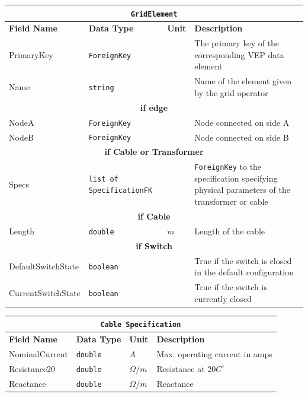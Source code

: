 \vspace{.5cm}

\begin{tabular}{ l p{3cm} l p{8cm}} 
    \hline
    \multicolumn{4}{c}{\texttt{GridElement}}\\
    \hline
    \textbf{Field Name} & \textbf{Data Type}            & \textbf{Unit} & \textbf{Description} \\
    \hline
    PrimaryKey          & \texttt{ForeignKey}           &               & The primary key of the corresponding VEP data element\\
    Name                & \texttt{string}               &               & Name of the element given by the grid operator\\
    \hline
    \multicolumn{4}{c}{\textbf{if edge}}\\
    \hline
    NodeA               & \texttt{ForeignKey}           &               & Node connected on side A\\
    NodeB               & \texttt{ForeignKey}           &               & Node connected on side B\\
    \hline
    \multicolumn{4}{c}{\textbf{if Cable or Transformer}}\\
    \hline
    Specs               & \texttt{list of SpecificationFK}             &               & \texttt{ForeignKey} to the specification specifying physical parameters of the transformer or cable\\
    \hline
    \multicolumn{4}{c}{\textbf{if Cable}}\\
    \hline
    Length              & \texttt{double}              &  $m$          & Length of the cable\\
    \hline
    \multicolumn{4}{c}{\textbf{if Switch}}\\
    \hline
    DefaultSwitchState  & \texttt{boolean}             &               & True if the switch is closed in the default configuration\\
    CurrentSwitchState  & \texttt{boolean}             &               & True if the switch is currently closed\\
\end{tabular}

\vspace{.5cm}

\begin{tabular}{ l p{3cm} l p{8cm}} 
    \hline
    \multicolumn{4}{c}{\texttt{Cable Specification}}\\
    \hline
    \textbf{Field Name} & \textbf{Data Type}        & \textbf{Unit} & \textbf{Description} \\
    \hline
    NominalCurrent      & \texttt{double}           & $A$           & Max. operating current in amps\\              
    Resistance20        & \texttt{double}           & $\Omega/m$    & Resistance at $20C^\circ$\\  
    Reactance           & \texttt{double}           & $\Omega/m$    & Reactance\\              
\end{tabular}

